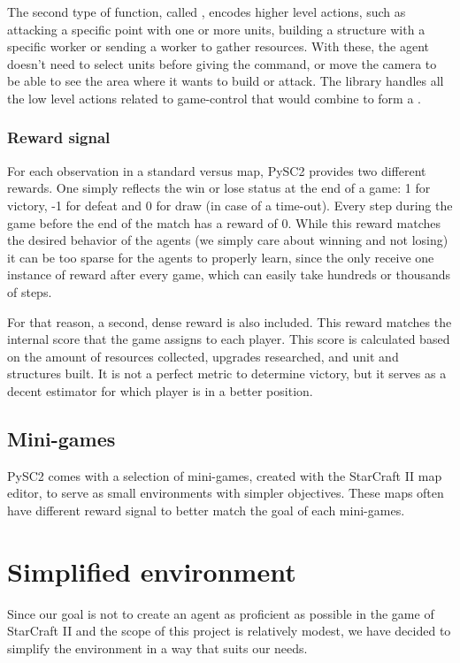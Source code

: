 The second type of function, called , encodes higher level actions, such as attacking a specific point with one or more units, building a structure with a specific worker or sending a worker to gather resources. With these, the agent doesn't need to select units before giving the command, or move the camera to be able to see the area where it wants to build or attack. The library handles all the low level  actions related to game-control that would combine to form a .

\subsubsection*{Reward signal}

For each observation in a standard versus map, PySC2 provides two different rewards. One simply reflects the win or lose status at the end of a game: 1 for victory, -1 for defeat and 0 for draw (in case of a time-out). Every step during the game before the end of the match has a reward of 0. While this reward matches the desired behavior of the agents (we simply care about winning and not losing) it can be too sparse for the agents to properly learn, since the only receive one instance of reward after every game, which can easily take hundreds or thousands of steps.

For that reason, a second, dense reward is also included. This reward matches the internal score that the game assigns to each player. This score is calculated based on the amount of resources collected, upgrades researched, and unit and structures built. It is not a perfect metric to determine victory, but it serves as a decent estimator for which player is in a better position.

\subsection{Mini-games}

PySC2 comes with a selection of mini-games, created with the StarCraft II map editor, to serve as small environments with simpler objectives. These maps often have different reward signal to better match the goal of each mini-games.

\section{Simplified environment}

Since our goal is not to create an agent as proficient as possible in the game of StarCraft II and the scope of this project is relatively modest, we have decided to simplify the environment in a way that suits our needs.

